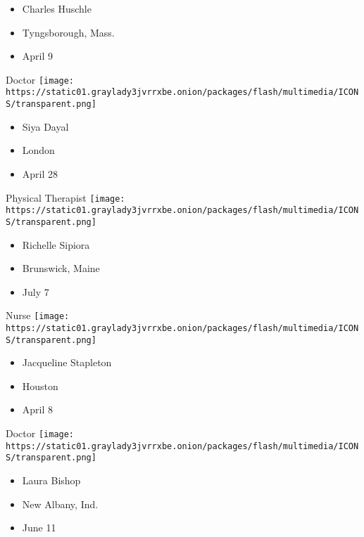 \begin{itemize}
\tightlist
\item
  Charles Huschle
\item
  Tyngsborough, Mass.
\item
  April 9
\end{itemize}

\protect\hyperlink{item-siya-dayal}{}

Doctor
\texttt{[image: https://static01.graylady3jvrrxbe.onion/packages/flash/multimedia/ICONS/transparent.png]}

\begin{itemize}
\tightlist
\item
  Siya Dayal
\item
  London
\item
  April 28
\end{itemize}

\protect\hyperlink{item-richelle-sipiora}{}

Physical Therapist
\texttt{[image: https://static01.graylady3jvrrxbe.onion/packages/flash/multimedia/ICONS/transparent.png]}

\begin{itemize}
\tightlist
\item
  Richelle Sipiora
\item
  Brunswick, Maine
\item
  July 7
\end{itemize}

\protect\hyperlink{item-jacqueline-stapleton}{}

Nurse
\texttt{[image: https://static01.graylady3jvrrxbe.onion/packages/flash/multimedia/ICONS/transparent.png]}

\begin{itemize}
\tightlist
\item
  Jacqueline Stapleton
\item
  Houston
\item
  April 8
\end{itemize}

\protect\hyperlink{item-laura-bishop}{}

Doctor
\texttt{[image: https://static01.graylady3jvrrxbe.onion/packages/flash/multimedia/ICONS/transparent.png]}

\begin{itemize}
\tightlist
\item
  Laura Bishop
\item
  New Albany, Ind.
\item
  June 11
\end{itemize}

